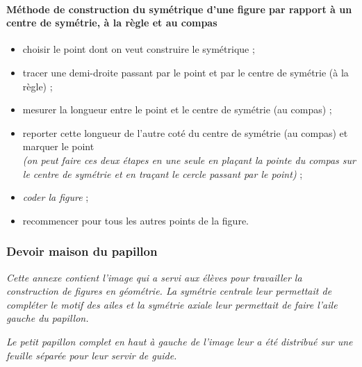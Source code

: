 \paragraph{Méthode de construction du symétrique d'une figure par rapport à un centre de symétrie, à la règle et au compas}
\begin{itemize}
    \item choisir le point dont on veut construire le symétrique ;
    \item tracer une demi-droite passant par le point et par le centre de symétrie (à la règle) ;
    \item mesurer la longueur entre le point et le centre de symétrie (au compas) ;
    \item reporter cette longueur de l'autre coté du centre de symétrie (au compas) et marquer le point\\
    \textit{(on peut faire ces deux étapes en une seule en plaçant la pointe du compas sur le centre de symétrie et en traçant le cercle passant par le point)} ;
    \item \textit{coder la figure} ;
    \item recommencer pour tous les autres points de la figure.
\end{itemize}

\newpage
\subsubsection{Devoir maison du papillon}\label{papillon}
\textit{Cette annexe contient l'image qui a servi aux élèves pour travailler la construction de figures en géométrie. La symétrie centrale leur permettait de compléter le motif des ailes et la symétrie axiale leur permettait de faire l'aile gauche du papillon.}

\textit{Le petit papillon complet en haut à gauche de l'image leur a été distribué sur une feuille séparée pour leur servir de guide.}
\begin{figure}[!h]
\end{figure}